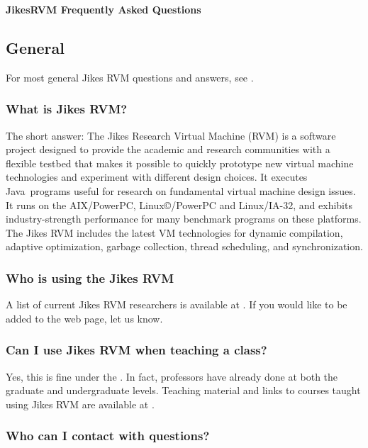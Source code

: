 \begin{center}  
{\bf Jikes\trademark RVM Frequently Asked Questions}
\end{center}

\subsection{General}

For most general Jikes RVM questions and answers, see
\xlink{{\tt \QandAURL}}{\QandAURL}.

\subsubsection{What is Jikes RVM?} 

The short answer:
The Jikes Research Virtual Machine (RVM) is a software project
designed to provide the academic and research communities with a
flexible testbed that makes it possible to quickly prototype new
virtual machine technologies and experiment with different design
choices. It executes Java\JavaTMFootnote\ programs useful for research on
fundamental virtual machine design issues.
It runs on the AIX\AIXTMFootnote/PowerPC\PowerPCTMFootnote,
Linux\copyright/PowerPC and Linux/IA-32, 
and exhibits industry-strength performance for many benchmark programs
on these platforms.  The Jikes RVM includes the latest VM
technologies for dynamic compilation, adaptive optimization, garbage
collection, thread scheduling, and synchronization.

\subsubsection{Who is using the Jikes RVM}
A list of current Jikes RVM researchers is available at
\xlink{{\tt \RVMUserListURL}}{\RVMUserListURL}.  If you would like to 
be added to the web page, let us know.

\subsubsection{Can I use Jikes RVM when teaching a class?}

Yes, this is fine under the
.  In fact,  professors
have already done at both the graduate and undergraduate levels.
Teaching material and links to courses taught using Jikes RVM are
available at
\xlink{{\tt \RVMTeachingResourcesURL}}{\RVMTeachingResourcesURL}.

\subsubsection{Who can I contact with questions?}

